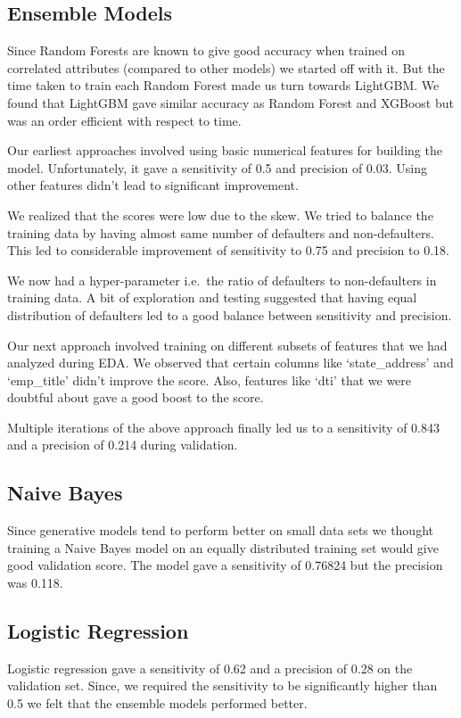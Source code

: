 \documentclass[conference]{IEEEtran}
\begin{document}
\subsection{Ensemble Models}
Since Random Forests are known to give good accuracy when trained on correlated
attributes (compared to other models) we started off with it. But the time taken
to train each Random Forest made us turn towards LightGBM\@. We found that LightGBM
gave similar accuracy as Random Forest and XGBoost but was an order efficient
with respect to time.

Our earliest approaches involved using basic numerical features for building the
model. Unfortunately, it gave a sensitivity of 0.5 and precision of 0.03. Using
other features didn't lead to significant improvement.

We realized that the scores were low due to the skew. We tried to balance the
training data by having almost same number of defaulters and non-defaulters.
This led to considerable improvement of sensitivity to 0.75 and precision to
0.18.

We now had a hyper-parameter i.e.\ the ratio of defaulters to non-defaulters in
training data. A bit of exploration and testing suggested that having equal
distribution of defaulters led to a good balance between sensitivity and
precision.

Our next approach involved training on different subsets of features that we
had analyzed during EDA. We observed that certain columns like `state\_address'
and `emp\_title' didn't improve the score. Also, features like `dti' that we
were doubtful about gave a good boost to the score.

Multiple iterations of the above approach finally led us to a sensitivity of
0.843 and a precision of 0.214 during validation.

\subsection{Naive Bayes}
Since generative models tend to perform better on small data sets we thought
training a Naive Bayes model on an equally distributed training set would give
good validation score. The model gave a sensitivity of 0.76824 but the precision
was 0.118.

\subsection{Logistic Regression}
Logistic regression gave a sensitivity of 0.62 and a precision of 0.28 on the
validation set. Since, we required the sensitivity to be significantly higher
than 0.5 we felt that the ensemble models performed better.
\end{document}
